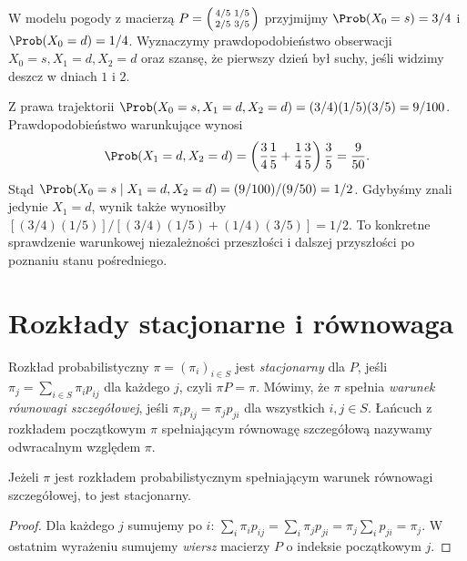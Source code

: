 \begin{przyklad}
W modelu pogody z macierzą
$P=\begin{psmallmatrix}4/5&1/5\\2/5&3/5\end{psmallmatrix}$
przyjmijmy $\Prob(X_0=s)=3/4$ i
$\Prob(X_0=d)=1/4$. Wyznaczymy prawdopodobieństwo
obserwacji $X_0=s,X_1=d,X_2=d$ oraz szansę,
że pierwszy dzień był suchy, jeśli widzimy
deszcz w dniach $1$ i $2$.

Z prawa trajektorii
$\Prob(X_0=s,X_1=d,X_2=d)
=(3/4)(1/5)(3/5)=9/100$.
Prawdopodobieństwo warunkujące wynosi
\[
\Prob(X_1=d,X_2=d)
=\left(\frac34\frac15+\frac14\frac35\right)\frac35
=\frac9{50}.
\]
Stąd
$\Prob(X_0=s\mid X_1=d,X_2=d)
=(9/100)/(9/50)=1/2$.
Gdybyśmy znali jedynie $X_1=d$, wynik także
wynosiłby
$[(3/4)(1/5)]/[(3/4)(1/5)+(1/4)(3/5)]=1/2$.
To konkretne sprawdzenie warunkowej niezależności
przeszłości i dalszej przyszłości po poznaniu
stanu pośredniego.
\end{przyklad}

\section{Rozkłady stacjonarne i równowaga}

\begin{definicja}
Rozkład probabilistyczny $\pi=(\pi_i)_{i\in S}$
jest \emph{stacjonarny} dla $P$, jeśli
$\pi_j=\sum_{i\in S}\pi_i p_{ij}$ dla każdego $j$,
czyli $\pi P=\pi$.
Mówimy, że $\pi$ spełnia \emph{warunek równowagi
szczegółowej}, jeśli
$\pi_i p_{ij}=\pi_jp_{ji}$ dla wszystkich $i,j\in S$.
Łańcuch z rozkładem początkowym $\pi$ spełniającym
równowagę szczegółową nazywamy odwracalnym
względem $\pi$.
\end{definicja}

\begin{stwierdzenie}
Jeżeli $\pi$ jest rozkładem probabilistycznym
spełniającym warunek równowagi szczegółowej,
to jest stacjonarny.
\end{stwierdzenie}
\begin{proof}
Dla każdego $j$ sumujemy po $i$:
$\sum_i\pi_i p_{ij}=\sum_i\pi_jp_{ji}
=\pi_j\sum_i p_{ji}=\pi_j$.
W ostatnim wyrażeniu sumujemy \emph{wiersz}
macierzy $P$ o indeksie początkowym $j$.
\end{proof}

